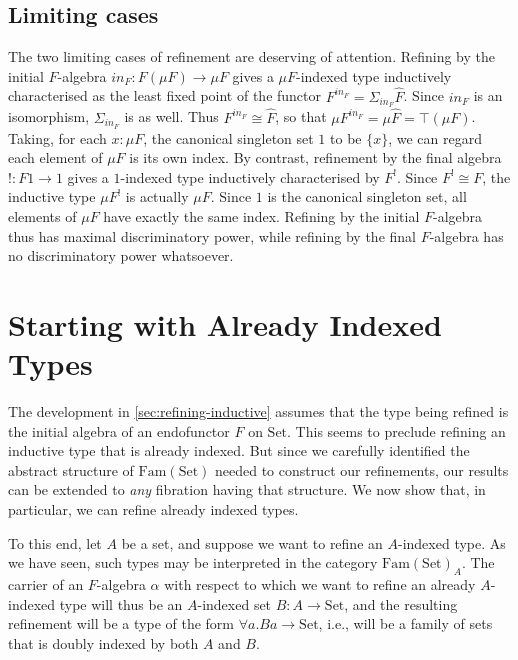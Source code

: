 \documentclass{LMCS}
\newcommand{\inn}{\mathit{in}}
\newcommand{\Fam}{\mathrm{Fam}}
\newcommand{\Set}{\mathrm{Set}}
\begin{document}
\subsection{Limiting cases} 

The two limiting cases of refinement are deserving of attention.
Refining by the initial $F$-algebra $\inn_F : F(\mu F) \to \mu F$
gives a $\mu F$-indexed type inductively characterised as the least
fixed point of the functor $F^{\inn_F} = \Sigma_{\inn_F}
\hat{F}$. Since $\inn_F$ is an isomorphism, $\Sigma_{\inn_F}$ is as
well. Thus $F^{\inn_F} \cong \hat{F}$, so that $\mu F^{\inn_F} = \mu
\hat{F} = \top (\mu F)$. Taking, for each $x : \mu F$, the canonical
singleton set $1$ to be $\{x\}$, we can regard each element of $\mu F$
is its own index. By contrast, refinement by the final algebra $! : F1
\to 1$ gives a $1$-indexed type inductively characterised by
$F^!$. Since $F^! \cong F$, the inductive type $\mu F^!$ is actually
$\mu F$. Since $1$ is the canonical singleton set, all elements of
$\mu F$ have exactly the same index.  Refining by the initial
$F$-algebra thus has maximal discriminatory power, while refining by
the final $F$-algebra has no discriminatory power whatsoever.

\section{Starting with Already Indexed
  Types}\label{sec:indexed-refinement}  

The development in \autoref{sec:refining-inductive} assumes that the
type being refined is the initial algebra of an endofunctor $F$ on
$\Set$. This seems to preclude refining an inductive type that is
already indexed. But since we carefully identified the abstract
structure of $\Fam(\Set)$ needed to construct our refinements, our
results can be extended to {\em any} fibration having that
structure. We now show that, in particular, we can refine already
indexed types.

To this end, let $A$ be a set, and suppose we want to refine an
$A$-indexed type.  As we have seen, such types may be interpreted in
the category $\Fam(\Set)_A$. The carrier of an $F$-algebra $\alpha$
with respect to which we want to refine an already $A$-indexed type
will thus be an $A$-indexed set $B : A \to \Set$, and the resulting
refinement will be a type of the form $\forall a. B a \to \Set$, i.e.,
will be a family of sets that is doubly indexed by both $A$ and $B$.
\end{document}
